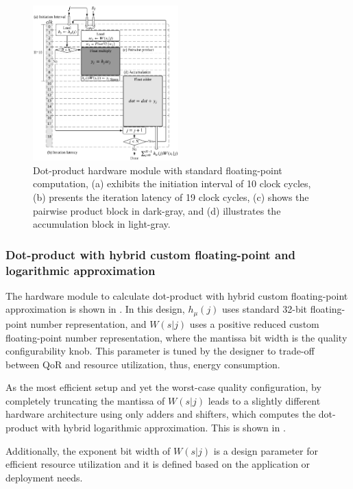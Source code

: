 \begin{figure}[t!]
	\centering
	\includegraphics[width=0.5\textwidth]{../figures/dot_product_float.pdf}
	\caption{Dot-product hardware module with standard floating-point computation, (a) exhibits the initiation interval of 10 clock cycles, (b) presents the iteration latency of 19 clock cycles, (c) shows the pairwise product block in dark-gray, and (d) illustrates the accumulation block in light-gray.}
	\label{fig:dot_product_float}
\end{figure}

\subsubsection{Dot-product with hybrid custom floating-point and logarithmic approximation}
 The hardware module to calculate dot-product with hybrid custom floating-point approximation is shown in . In this design, $h_\mu(j)$ uses standard 32-bit floating-point number representation, and $W(s|j)$ uses a positive reduced custom floating-point number representation, where the mantissa bit width is the quality configurability knob. This parameter is tuned by the designer to trade-off between QoR and resource utilization, thus, energy consumption.
 
 As the most efficient setup and yet the worst-case quality configuration, by completely truncating the mantissa of $W(s|j)$ leads to a slightly different hardware architecture using only adders and shifters, which computes the dot-product with hybrid logarithmic approximation. This is shown in .
 
Additionally, the exponent bit width of $W(s|j)$ is a design parameter for efficient resource utilization and it is defined based on the application or deployment needs.
 

